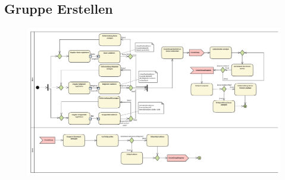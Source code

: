 \subsection*{Gruppe Erstellen}
\begin{figure}[h!]
	\centering
	\includegraphics[width=0.9\linewidth]{docs/3_Aktivitaetsdiagramme/Marius/GruppeErstellen.pdf}
	\label{fig:ActDia_Gruppe_Erstellen}
\end{figure}

\vfill